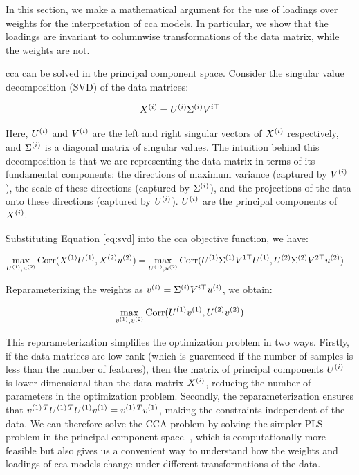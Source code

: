 In this section, we make a mathematical argument for the use of \gls{loadings} over weights for the interpretation of \acrshort{cca} models.
In particular, we show that the \gls{loadings} are invariant to columnwise transformations of the data matrix, while the weights are not.

\acrshort{cca} can be solved in the principal component space. Consider the singular value decomposition (SVD) of the data matrices:

\begin{align}
    X^{(i)} = U^{(i)}\Sigma^{(i)}V^{i\top} \label{eq:svd}
\end{align}

Here, $U^{(i)}$ and $V^{(i)}$ are the left and right singular vectors of $X^{(i)}$ respectively, and $\Sigma^{(i)}$ is a diagonal matrix of singular values.
The intuition behind this decomposition is that we are representing the data matrix in terms of its fundamental components: the directions of maximum variance (captured by $V^{(i)}$), the scale of these directions (captured by $\Sigma^{(i)}$), and the projections of the data onto these directions (captured by $U^{(i)}$).
$U^{(i)}$ are the principal components of $X^{(i)}$.

Substituting Equation \ref{eq:svd} into the \acrshort{cca} objective function, we have:

\begin{align}
    \max_{U^{(1)}, u^{(2)}} \operatorname{Corr}(X^{(1)}U^{(1)}, X^{(2)}u^{(2)}) &= \max_{U^{(1)}, u^{(2)}} \operatorname{Corr}(U^{(1)}\Sigma^{(1)}V^{1\top}U^{(1)}, U^{(2)}\Sigma^{(2)}V^{2\top}u^{(2)}) \label{eq:cca_obj}
\end{align}

Reparameterizing the weights as $v^{(i)} = \Sigma^{(i)}V^{i\top}u^{(i)}$, we obtain:

\begin{align}
    \max_{v^{(1)}, v^{(2)}} \operatorname{Corr}(U^{(1)}v^{(1)}, U^{(2)}v^{(2)}) \label{eq:reparam}
\end{align}

This reparameterization simplifies the optimization problem in two ways.
Firstly, if the data matrices are low rank (which is guarenteed if the number of samples is less than the number of features), then the matrix of principal components $U^{(i)}$ is lower dimensional than the data matrix $X^{(i)}$, reducing the number of parameters in the optimization problem.
Secondly, the reparameterization ensures that $v^{(1)\,T}U^{(1)\,T}U^{(1)}v^{(1)}=v^{(1)\,T}v^{(1)}$, making the constraints independent of the data.
We can therefore solve the CCA problem by solving the simpler PLS problem in the principal component space.
, which is computationally more feasible but also gives us a convenient way to understand how the weights and \gls{loadings} of \acrshort{cca} models change under different transformations of the data.

